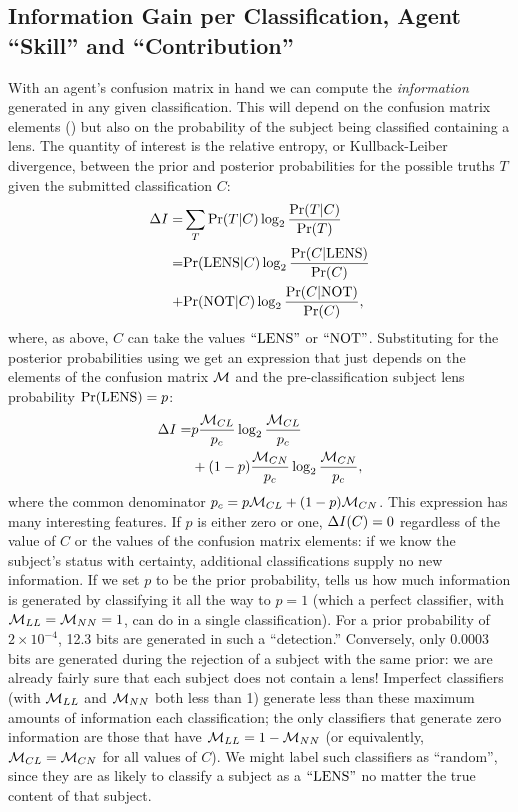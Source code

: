 \documentclass[useAMS,usenatbib,a4paper]{mn2e}
\begin{document}
\subsection{Information Gain per Classification, Agent ``Skill'' and ``Contribution''}
\label{appendix:swap:examples}

With an agent's confusion matrix in hand we can compute the
\emph{information} generated in any given classification. This will
depend on the confusion matrix elements () but also on
the probability of the subject being classified containing a lens. The
quantity of interest is the relative entropy, or Kullback-Leiber
divergence, between the prior and
posterior probabilities for the possible truths $T$
given the submitted classification $C$:
\begin{align}
\Delta I =& \sum_T {\rm Pr}(T|C) \log_2 \frac{{\rm Pr}(T|C)}{{\rm Pr}(T)}     \notag \\
             =&    {\rm Pr}({\rm LENS}|C) \log_2 \frac{{\rm Pr}(C|{\rm LENS})}{{\rm Pr}(C)} \notag \\
             +&    {\rm Pr}({\rm NOT}|C)  \log_2 \frac{{\rm Pr}(C|{\rm NOT})}{{\rm Pr}(C)},
\end{align}
where, as above, $C$ can take the values ${\rm ``LENS"}$ or ${\rm ``NOT"}$. 
Substituting for the posterior probabilities using  we get
an expression that just depends on the elements of the 
confusion matrix $\mathcal{M}$ and the pre-classification subject lens
probability ${\rm Pr}({\rm LENS}) = p$:
\begin{align}
\Delta I =    &     p \frac{\mathcal{M}_{CL}}{p_c} \log_2 \frac{\mathcal{M}_{CL}}{p_c}  \notag \\
                  & +(1-p)\frac{\mathcal{M}_{CN}}{p_c} \log_2 \frac{\mathcal{M}_{CN}}{p_c},
  \label{eq:app:infogain}
\end{align}
where the common denominator $p_c = p\mathcal{M}_{CL} + (1-p)\mathcal{M}_{CN}$. This
expression has many interesting features.  If $p$ is either zero or one,
$\Delta I(C) = 0$  regardless of the value of $C$ or the values of
the confusion matrix elements: if we know the subject's status with
certainty, additional classifications supply no new information. If we
set $p$ to be the prior probability,  tells us how
much information is generated by classifying it all the way to $p = 1$
(which a perfect classifier, with $\mathcal{M}_{LL} = \mathcal{M}_{NN} = 1$, can do in a
single classification). For a prior probability of $2\times 10^{-4}$, 
12.3 bits are generated in such a ``detection.''  Conversely, only
0.0003 bits are generated during the rejection of a subject with the
same prior: we are already fairly sure that each subject does not
contain a lens! Imperfect classifiers (with $\mathcal{M}_{LL}$ and $\mathcal{M}_{NN}$
both less than 1)  generate less than these maximum amounts of
information each classification; the only classifiers that generate zero
information are those that have $\mathcal{M}_{LL} = 1 - \mathcal{M}_{NN}$ (or
equivalently, $\mathcal{M}_{CL} = \mathcal{M}_{CN}$ for all values of $C$). We might
label such classifiers as ``random'', since they are as likely to
classify a subject as a ${\rm ``LENS"}$ no matter the true content of that
subject. 
\end{document}
